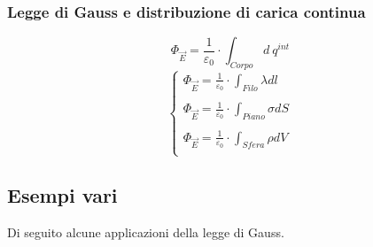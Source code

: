 \documentclass[twoside]{article}
\begin{document}
\subsubsection{Legge di Gauss e distribuzione di carica continua}
\begin{equation}
    \boxed{\Phi_{\vec{E}} = \displaystyle \frac{1}{\varepsilon_0} \cdot \int_{Corpo} d\ q^{int}}
\end{equation}
\begin{equation*}
    \begin{cases}
        \Phi_{\vec{E}} = \displaystyle \frac{1}{\varepsilon_0} \cdot \int_{Filo} \lambda dl \\
        \\
        \Phi_{\vec{E}} = \displaystyle \frac{1}{\varepsilon_0} \cdot \int_{Piano} \sigma dS \\
        \\
        \Phi_{\vec{E}} = \displaystyle \frac{1}{\varepsilon_0} \cdot \int_{Sfera} \rho dV   \\
    \end{cases}
\end{equation*}
\newpage
\subsection{Esempi vari}
Di seguito alcune applicazioni della legge di Gauss.
\end{document}
